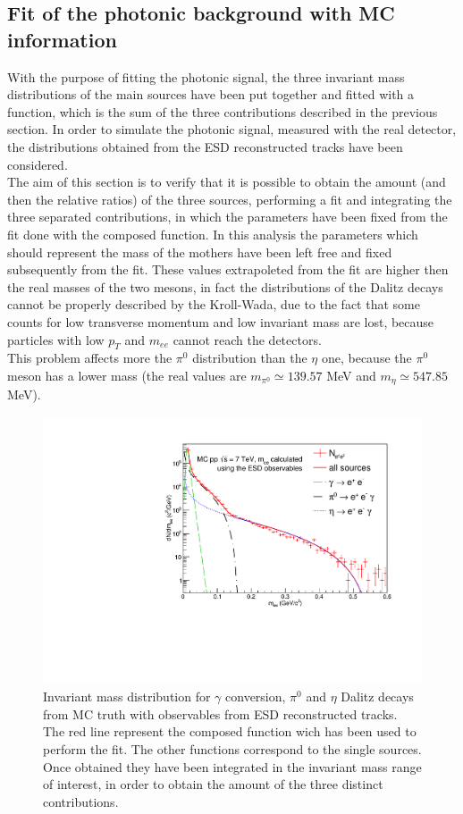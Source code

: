 \documentclass[a4paper,twocolumn,gsifonts,twoside]{gsipaper}
\begin{document}
\subsection{Fit of the photonic background with MC information}
\label{subsec:fit}
With the purpose of fitting the photonic signal, the three invariant mass distributions of the main sources have been put together and 
fitted with a function, which is the sum of the three contributions described in the previous section. In order to simulate the photonic
signal, measured with the real detector, the distributions obtained from the ESD reconstructed tracks have been considered.\\
The aim of this section is to verify that it is possible to obtain the amount (and then the relative ratios) of the three sources, 
performing a fit and integrating the three separated contributions, in which the parameters have been fixed from the fit done with the 
composed function. In this analysis the parameters which should represent the mass of the mothers have been left free and fixed 
subsequently from the fit. 
These values extrapoleted from the fit are higher then the real masses of the two mesons, in fact the distributions of the Dalitz decays 
cannot be properly described by the Kroll-Wada, due to the fact that some counts for low transverse momentum and low invariant mass are 
lost, because particles with low $p_{T}$ and $m_{ee}$ cannot reach the detectors.\\
This problem affects more the $\pi^{0}$ distribution than the $\eta$ one, because the $\pi^{0}$ meson has a lower mass (the real values 
are $m_{\pi^{0}} \simeq 139.57$ MeV and $m_{\eta} \simeq 547.85$ MeV).

\begin{figure}[tb]
\center
\includegraphics[scale = 0.7]{Inv_mass_ESD.pdf}
\caption{Invariant mass distribution for $\gamma$ conversion, $\pi^{0}$ and $\eta$ Dalitz decays from MC truth with 
observables from ESD reconstructed tracks. The red line represent the composed function wich has been used to perform the fit.
The other functions correspond to the single sources. Once obtained they have been integrated in the invariant mass range of interest, 
in order to obtain the amount of the three distinct contributions.}
\label{ESDdist}
\end{figure}
\end{document}
